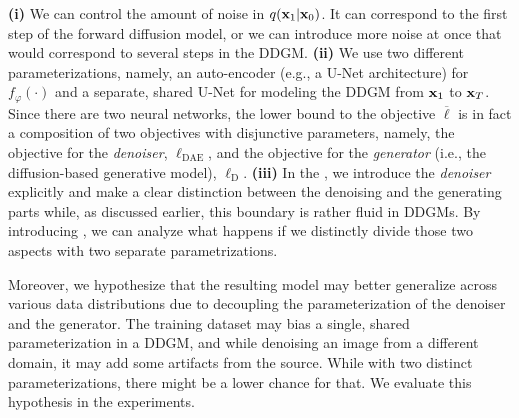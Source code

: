 \textbf{(i)} We can control the amount of noise in $q({\mathbf{x}}_1|{\mathbf{x}}_0)$. It can correspond to the first step of the forward diffusion model, or we can introduce more noise at once that would correspond to several steps in the DDGM. \textbf{(ii)} We use two different parameterizations, namely, an auto-encoder (e.g., a U-Net architecture) for $f_{\varphi}(\cdot)$ and a separate, shared U-Net for modeling the DDGM from ${\mathbf{x}}_1$ to ${\mathbf{x}}_T$. Since there are two neural networks, the lower bound to the objective $\overline{\ell}$ is in fact a composition of two objectives with disjunctive parameters, namely, the objective for the \textit{denoiser}, $\ell_{\text{DAE}}$, and the objective for the \textit{generator} (i.e., the diffusion-based generative model), $\ell_{\text{D}}$. \textbf{(iii)} In the \ours{}, we introduce the \textit{denoiser} explicitly and make a clear distinction between the denoising and the generating parts while, as discussed earlier, this boundary is rather fluid in DDGMs. By introducing \ours{}, we can analyze what happens if we distinctly divide those two aspects with two separate parametrizations.

Moreover, we hypothesize that the resulting model may better generalize across various data distributions due to decoupling the parameterization of the denoiser and the generator. The training dataset may bias a single, shared parameterization in a DDGM, and while denoising an image from a different domain, it may add some artifacts from the source. While with two distinct parameterizations, there might be a lower chance for that. We evaluate this hypothesis in the experiments. 